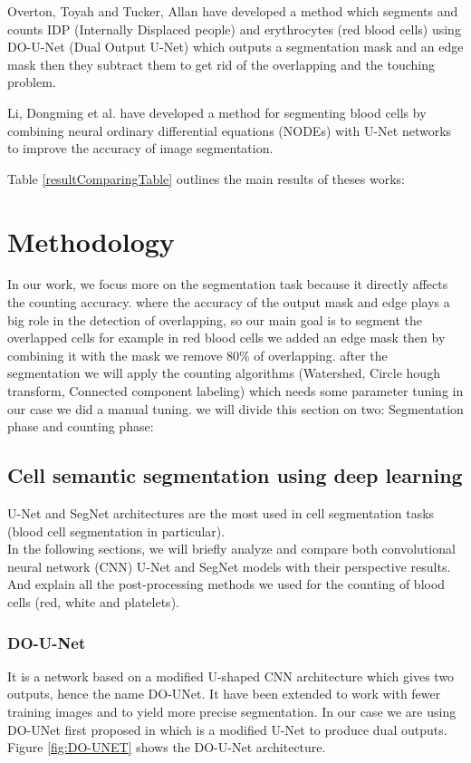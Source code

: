 \documentclass[conference]{IEEEtran}
\begin{document}
Overton, Toyah and Tucker, Allan \cite{10.1007/978-3-030-44584-3_31} have developed a method which segments and counts IDP (Internally Displaced people) and erythrocytes (red blood cells) using DO-U-Net (Dual Output U-Net) which outputs a segmentation mask and an edge mask then they subtract them to get rid of the overlapping and the touching problem.

Li, Dongming et al. \cite{li2021robust} have developed a method for segmenting blood cells by combining neural ordinary differential equations (NODEs) with U-Net networks to improve the accuracy of image segmentation.

Table \ref{resultComparingTable} outlines the main results of theses works:


\section{Methodology}
In our work, we focus more on the segmentation task because it directly affects the counting accuracy. where the accuracy of the output mask and edge plays a big role in the detection of overlapping, so our main goal is to segment the overlapped cells for example in red blood cells we added an edge mask then by combining it with the mask we remove 80\% of overlapping. after the segmentation we will apply the counting algorithms (Watershed, Circle hough transform, Connected component labeling) which needs some parameter tuning in our case we did a manual tuning. we will divide this section on two: Segmentation phase and counting phase:
\subsection{Cell semantic segmentation using deep learning}
U-Net and SegNet architectures are the most used in cell segmentation tasks \cite{asgari2021deep}
(blood cell segmentation in particular).\\
In the following sections, we will briefly analyze and compare both convolutional neural network (CNN) U-Net and SegNet models with their perspective results.
And explain all the post-processing methods we used for the counting of blood cells (red, white and platelets).

\subsubsection{\textbf{DO-U-Net}}
It is a network based on a modified U-shaped CNN architecture which gives two outputs, hence the name DO-UNet. It have been extended to work with fewer training images and to yield more precise segmentation. In our case we are using DO-UNet first proposed in \cite{10.1007/978-3-030-44584-3_31} which is a modified U-Net to produce dual outputs.
Figure \ref{fig:DO-UNET} shows the DO-U-Net architecture.
\end{document}
